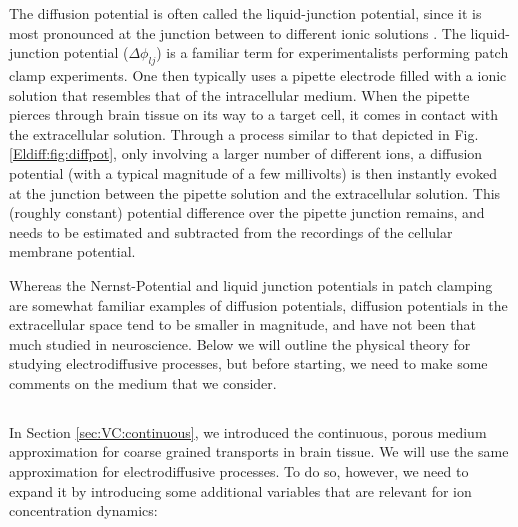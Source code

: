 The diffusion potential is often called the liquid-junction potential, since it is most pronounced at the junction between to different ionic solutions \citep{Sokalski2001}. The liquid-junction potential ($\Delta \phi_{lj}$) is a familiar term for experimentalists performing patch clamp experiments. One then typically uses a pipette electrode filled with a ionic solution that resembles that of the intracellular medium. When the pipette pierces through brain tissue on its way to a target cell, it comes in contact with the extracellular solution. Through a process similar to that depicted in Fig. \ref{Eldiff:fig:diffpot}, only involving a larger number of different ions, a diffusion potential (with a typical magnitude of a few millivolts) is then instantly evoked at the junction between the pipette solution and the extracellular solution. This (roughly constant) potential difference over the pipette junction remains, and needs to be estimated and subtracted from the recordings of the cellular membrane potential.

Whereas the Nernst-Potential and liquid junction potentials in patch clamping are somewhat familiar examples of diffusion potentials, diffusion potentials in the extracellular space tend to be smaller in magnitude, and have not been that much studied in neuroscience. Below we will outline the physical theory for studying electrodiffusive processes, but before starting, we need to make some comments on the medium that we consider. 


\subsection{}
\label{sec:Eldiff:porous}
In Section \ref{sec:VC:continuous}, we introduced the continuous, porous medium approximation for coarse grained transports in brain tissue. We will use the same approximation for electrodiffusive processes. To do so, however, we need to expand it by introducing some additional variables that are relevant for ion concentration dynamics:

